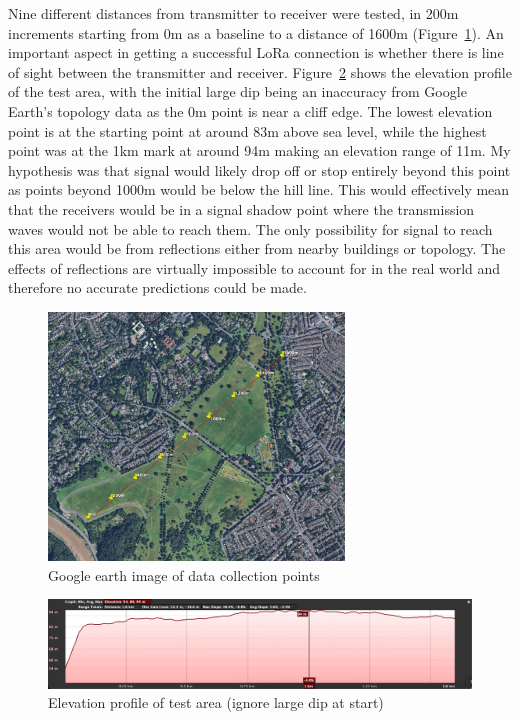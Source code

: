 Nine different distances from transmitter to receiver were tested, in 200m
increments starting from 0m as a baseline to a distance of 1600m
(Figure~\ref{fig:range-test-markers}). An important aspect in getting a
successful LoRa connection is whether there is line of sight between the
transmitter and receiver. Figure~\ref{fig:range-test-elevation} shows the
elevation profile of the test area, with the initial large dip being an
inaccuracy from Google Earth's topology data as the 0m point is near a cliff
edge. The lowest elevation point is at the starting point at around 83m above
sea level, while the highest point was at the 1km mark at around 94m making an
elevation range of 11m. My hypothesis was that signal would likely drop off or
stop entirely beyond this point as points beyond 1000m would be below the hill
line. This would effectively mean that the receivers would be in a signal shadow
point where the transmission waves would not be able to reach them. The only
possibility for signal to reach this area would be from reflections either from
nearby buildings or topology. The effects of reflections are virtually
impossible to account for in the real world and therefore no accurate
predictions could be made.

\begin{figure}[H]
    \centering
    \includegraphics[width=0.7\textwidth]{contents/part-2/fig2/range-test-markers.jpg}
    \caption{Google earth image of data collection points}
    \label{fig:range-test-markers}
\end{figure}


\begin{figure}[H]
    \centering
    \includegraphics[width=1\textwidth]{contents/part-2/fig2/range-test-elevation-profile.jpg}
    \caption{Elevation profile of test area (ignore large dip at start)}
    \label{fig:range-test-elevation}
\end{figure}

